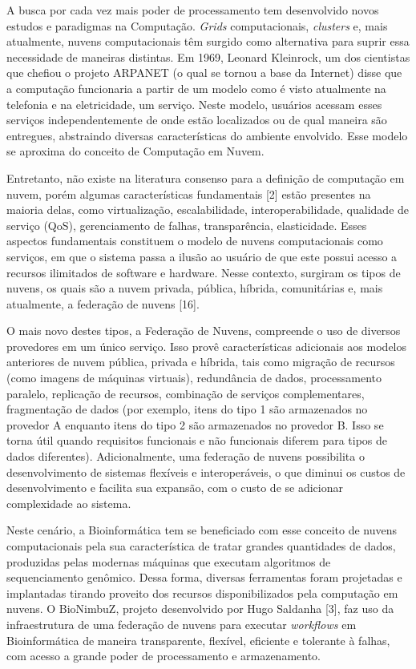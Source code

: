 A busca por cada vez mais poder de processamento tem desenvolvido novos estudos e paradigmas na Computação. \textit{Grids} computacionais, \textit{clusters} e, mais atualmente, nuvens computacionais têm surgido como alternativa para suprir essa necessidade de maneiras distintas. Em 1969, Leonard Kleinrock, um dos cientistas que chefiou o projeto ARPANET (o qual se tornou a base da Internet) disse que a computação funcionaria a partir de um modelo como é visto atualmente na telefonia e na eletricidade, um serviço. Neste modelo, usuários acessam esses serviços independentemente de onde estão localizados ou de qual maneira são entregues, abstraindo diversas características do ambiente envolvido. Esse modelo se aproxima do conceito de Computação em Nuvem.

Entretanto, não existe na literatura consenso para a definição de computação em nuvem, porém algumas características fundamentais [2] estão presentes na maioria delas, como virtualização, escalabilidade, interoperabilidade, qualidade de serviço (QoS), gerenciamento de falhas, transparência, elasticidade. Esses aspectos fundamentais constituem o modelo de nuvens computacionais como serviços, em que o sistema passa a ilusão ao usuário de que este possui acesso a recursos ilimitados de software e hardware. Nesse contexto, surgiram os tipos de nuvens, os quais são a nuvem privada, pública, híbrida, comunitárias e, mais atualmente, a federação de nuvens [16]. 

O mais novo destes tipos, a Federação de Nuvens, compreende o uso de diversos provedores em um único serviço. Isso provê características adicionais aos modelos anteriores de nuvem pública, privada e híbrida, tais como migração de recursos (como imagens de máquinas virtuais), redundância de dados, processamento paralelo, replicação de recursos, combinação de serviços complementares, fragmentação de dados (por exemplo, itens do tipo 1 são armazenados no provedor A enquanto itens do tipo 2 são armazenados no provedor B. Isso se torna útil quando requisitos funcionais e não funcionais diferem para tipos de dados diferentes). Adicionalmente, uma federação de nuvens possibilita o desenvolvimento de sistemas flexíveis e interoperáveis, o que diminui os custos de desenvolvimento e facilita sua expansão, com o custo de se adicionar complexidade ao sistema.

Neste cenário, a Bioinformática tem se beneficiado com esse conceito de nuvens computacionais pela sua característica de tratar grandes quantidades de dados, produzidas pelas modernas máquinas que executam algoritmos de sequenciamento genômico. Dessa forma, diversas ferramentas foram projetadas e implantadas tirando proveito dos recursos disponibilizados pela computação em nuvens. O BioNimbuZ, projeto desenvolvido por Hugo Saldanha [3], faz uso da infraestrutura de uma federação de nuvens para executar \textit{workflows} em Bioinformática de maneira transparente, flexível, eficiente e tolerante à falhas, com acesso a grande poder de processamento e armazenamento.


